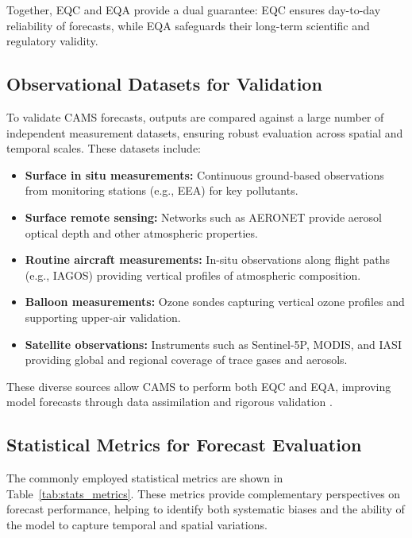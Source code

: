 Together, EQC and EQA provide a dual guarantee: EQC ensures day-to-day reliability of forecasts, while EQA safeguards their long-term scientific and regulatory validity.


\subsection{Observational Datasets for Validation}
To validate CAMS forecasts, outputs are compared against a large number of independent measurement datasets, ensuring robust evaluation across spatial and temporal scales. These datasets include:

\begin{itemize}
	\item \textbf{Surface in situ measurements:} Continuous ground-based observations from monitoring stations (e.g., EEA) for key pollutants.
	\item \textbf{Surface remote sensing:} Networks such as AERONET provide aerosol optical depth and other atmospheric properties.
	\item \textbf{Routine aircraft measurements:} In-situ observations along flight paths (e.g., IAGOS) providing vertical profiles of atmospheric composition.
	\item \textbf{Balloon measurements:} Ozone sondes capturing vertical ozone profiles and supporting upper-air validation.
	\item \textbf{Satellite observations:} Instruments such as Sentinel-5P, MODIS, and IASI providing global and regional coverage of trace gases and aerosols.
\end{itemize}

These diverse sources allow CAMS to perform both EQC and EQA, improving model forecasts through data assimilation and rigorous validation \cite{eskes2024evaluation}.

\subsection{Statistical Metrics for Forecast Evaluation}

The commonly employed statistical metrics are shown in Table~\ref{tab:stats_metrics}. These metrics provide complementary perspectives on forecast performance, helping to identify both systematic biases and the ability of the model to capture temporal and spatial variations.


